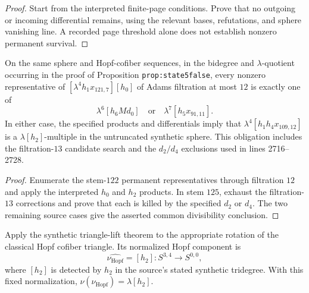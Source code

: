 \begin{proof}
  Start from the interpreted finite-page conditions. Prove that no
  outgoing or incoming differential remains, using the relevant bases,
  refutations, and sphere vanishing line. A recorded page threshold
  alone does not establish nonzero permanent survival.
\end{proof}

\begin{proposition}
  \label{evidence:stem122-product-exhaustion}
  \notready
  On the same sphere and Hopf-cofiber sequences, in the
  bidegree and
  $\lambda$-quotient occurring in the proof of
  Proposition \texttt{prop:state5false}, every nonzero representative of
  $[\lambda^4h_1x_{121,7}][h_0]$ of Adams filtration at most $12$ is exactly
  one of
  \[
    \lambda^6[h_6Md_0]\quad\text{or}\quad
    \lambda^7[h_5x_{91,11}].
  \]
  In either case, the specified products and differentials imply that $\lambda^4[h_1h_4x_{109,12}]$ is a
  $\lambda[h_2]$-multiple in the untruncated synthetic sphere. This obligation
  includes the filtration-$13$ candidate search and the $d_2/d_4$ exclusions
  used in lines 2716--2728.
\end{proposition}

\begin{proof}
  Enumerate the stem-$122$ permanent representatives through filtration
  $12$ and apply the interpreted $h_0$ and $h_2$ products. In stem $125$,
  exhaust the filtration-$13$ corrections and prove that each is killed
  by the specified $d_2$ or $d_4$. The two remaining source cases give
  the asserted common divisibility conclusion.
\end{proof}

\begin{proposition}
  \label{evidence:normalized-hopf-detection}
  \notready
  Apply the synthetic triangle-lift theorem to the
  appropriate rotation of the classical Hopf cofiber triangle. Its
  normalized Hopf component is
  \[
    \widehat{\nu_{\mathrm{Hopf}}}=[h_2]:S^{3,4}\longrightarrow S^{0,0},
  \]
  where $[h_2]$ is detected by $h_2$ in the source's stated synthetic
  tridegree.  With this fixed normalization,
  $\nu(\nu_{\mathrm{Hopf}})=\lambda[h_2]$.
\end{proposition}

